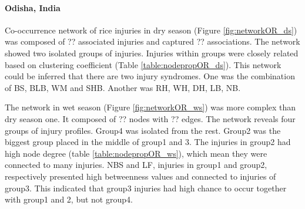 %

\paragraph{Odisha, India}

Co-occurrence network of rice injuries in dry season (Figure \ref{fig:networkOR_ds}) was composed of ?? associated injuries and captured ?? associations. The network showed two isolated groups of injuries. Injuries within groups were closely related based on clustering coefficient (Table \ref{table:nodepropOR_ds}). This network could be inferred that there are two injury syndromes. One was the combination of BS, BLB, WM and SHB. Another was RH, WH, DH, LB, NB.

The network in wet season (Figure \ref{fig:networkOR_ws}) was more complex than dry season one. It composed of ?? nodes with ?? edges. The network reveals four groups of injury profiles. Group4 was isolated from the rest. Group2 was the biggest group placed in the middle of group1 and 3. The injuries in group2 had high node degree (table \ref{table:nodepropOR_ws}), which mean they were connected to many injuries. NBS and LF, injuries in group1 and group2, respectively presented high betweenness values and connected to injuries of group3. This indicated that group3 injuries had high chance to occur together with group1 and 2, but not group4. 

